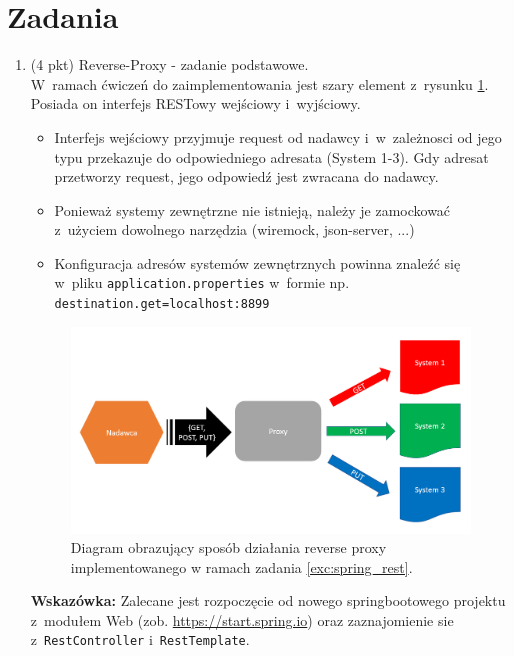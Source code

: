 \documentclass[12pt]{article}
\begin{document}
    \section*{Zadania}
    \begin{enumerate}
        \item\label{exc:spring_rest}
            (4 pkt) Reverse-Proxy - zadanie podstawowe.\\
            W~ramach ćwiczeń do zaimplementowania jest szary element z~rysunku \ref{fig:lista_3_proxy}. Posiada on interfejs RESTowy wejściowy i~wyjściowy.
            \begin{itemize}
                \item Interfejs wejściowy przyjmuje request od nadawcy i~w~zależnosci od jego typu przekazuje do odpowiedniego adresata (System 1-3). Gdy adresat przetworzy request, jego odpowiedź jest zwracana do nadawcy.
                \item Ponieważ systemy zewnętrzne nie istnieją, należy je zamockować z~użyciem dowolnego narzędzia (wiremock, json-server, ...)
                \item Konfiguracja adresów systemów zewnętrznych powinna znaleźć się w~pliku \texttt{applica\-tion.pro\-per\-ties} w~formie np. \texttt{destination.get=localhost:8899}
            \end{itemize}
            
	\begin{figure}[hb]
        \centering
        \includegraphics[width=\textwidth]{lista_3_proxy}
        \caption{Diagram obrazujący sposób działania reverse proxy implementowanego w ramach zadania \ref{exc:spring_rest}.}
        \label{fig:lista_3_proxy}
    \end{figure}

    \textbf{Wskazówka:} Zalecane jest rozpoczęcie od nowego springbootowego projektu z~modułem Web (zob. \url{https://start.spring.io}) oraz zaznajomienie sie z~\texttt{RestController} i~\texttt{RestTemplate}.


\end{enumerate}
\end{document}
